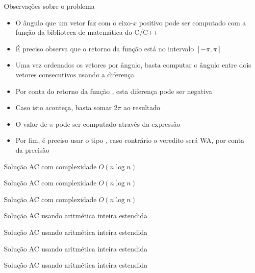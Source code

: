 \begin{frame}[fragile]{Observações sobre o problema}

    \begin{itemize}
        \item O ângulo que um vetor faz com o eixo-$x$ positivo pode ser computado com a 
            função  da biblioteca de matemática do C/C++

        \item É preciso observa que o retorno da função está no intervalo $[-\pi, \pi]$

        \item Uma vez ordenados os vetores por ângulo, basta computar o ângulo entre dois
            vetores consecutivos usando a diferença

        \item Por conta do retorno da função , esta diferença pode ser 
            negativa

        \item Caso isto aconteça, basta somar $2\pi$ ao resultado

        \item O valor de $\pi$ pode ser computado através da expressão 

        \item Por fim, é preciso usar o tipo , caso contrário o
            veredito será WA, por conta da precisão
    \end{itemize}

\end{frame}

\begin{frame}[fragile]{Solução AC com complexidade $O(n \log n)$}
\end{frame}

\begin{frame}[fragile]{Solução AC com complexidade $O(n \log n)$}
\end{frame}

\begin{frame}[fragile]{Solução AC com complexidade $O(n \log n)$}
\end{frame}

\begin{frame}[fragile]{Solução AC usando aritmética inteira estendida}
\end{frame}

\begin{frame}[fragile]{Solução AC usando aritmética inteira estendida}
\end{frame}

\begin{frame}[fragile]{Solução AC usando aritmética inteira estendida}
\end{frame}

\begin{frame}[fragile]{Solução AC usando aritmética inteira estendida}
\end{frame}
